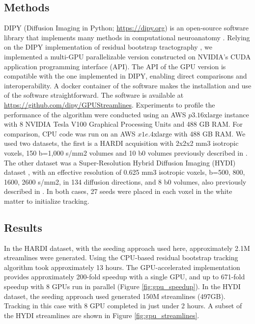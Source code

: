 \subsection{Methods}
DIPY (Diffusion Imaging in Python; \url{https://dipy.org}) is an open-source software library that implements many methods in computational neuroanatomy \cite{garyfallidis_dipy_2014}. Relying on the DIPY implementation of residual bootstrap tractography \cite{berman_probabilistic_2008}, we implemented a multi-GPU parallelizable version constructed on NVIDIA’s CUDA application programming interface (API).  The API of the GPU version is compatible with the one implemented in DIPY, enabling direct comparisons and interoperability. A docker container of the software makes the installation and use of the software straightforward. The software is available at \url{https://github.com/dipy/GPUStreamlines}. Experiments to profile the performance of the algorithm were conducted using an AWS $p3.16\textrm{xlarge}$ instance with 8 NVIDIA Tesla V100 Graphical Processing Units and 488 GB RAM. For comparison, CPU code was run on an AWS $x1e.4\textrm{xlarge}$ with 488 GB RAM. We used two datasets, the first is a HARDI acquisition with 2x2x2 mm3 isotropic voxels, 150 b=1,000 s/mm2 volumes and 10 b0 volumes previously described in \cite{rokem_evaluating_2015}. The other dataset was a Super-Resolution Hybrid Diffusion Imaging  (HYDI) dataset \cite{Garyfallidis2019}, with an effective resolution of 0.625 mm3 isotropic voxels, b=500, 800, 1600, 2600 s/mm2, in 134 diffusion directions, and 8 b0 volumes, also previously described in \cite{elsaid_super-resolution_2019}. In both cases, 27 seeds were placed in each voxel in the white matter to initialize tracking.

\subsection{Results} 
In the HARDI dataset, with the seeding approach used
here, approximately 2.1M streamlines were generated. Using the CPU-based
residual bootstrap tracking algorithm took approximately 13 hours. The
GPU-accelerated implementation provides approximately 200-fold speedup
with a single GPU, and up to 671-fold speedup with 8 GPUs run in
parallel (Figure \ref{fig:gpu_speedup}). In the HYDI dataset, the seeding approach used generated 150M streamlines (497GB). Tracking in this case with 8 GPU
completed in just under 2 hours. A subset of the HYDI streamlines are
shown in Figure \ref{fig:gpu_streamlines}.

